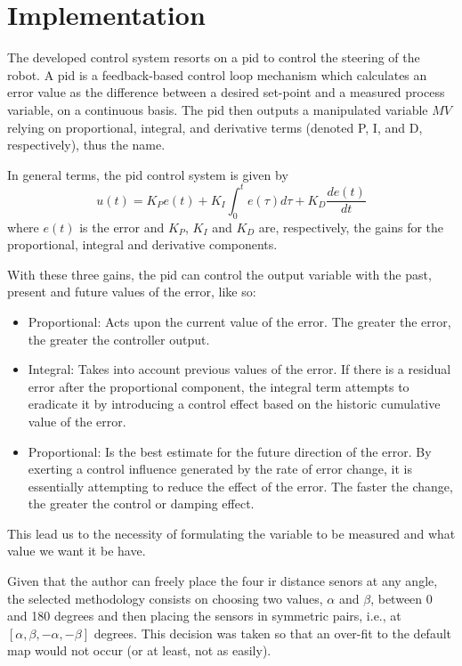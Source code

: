 \documentclass[runningheads]{llncs}
\begin{document}
\section{Implementation}
\label{sec:implementation}

The developed control system resorts on a \gls{pid} to control the steering of the robot. A \gls{pid} is a feedback-based control loop mechanism which calculates an error value as the difference between a desired set-point and a measured process variable, on a continuous basis. The \gls{pid} then outputs a manipulated variable $MV$ relying on proportional, integral, and derivative terms (denoted P, I, and D, respectively), thus the name.

In general terms, the \gls{pid} control system is given by 
%
\begin{equation}
    u(t) = K_P e(t) + K_I \int_0^t e(\tau) d\tau + K_D \frac{de(t)}{dt}
\end{equation}
%
where $e(t)$ is the error and $K_P$, $K_I$ and $K_D$ are, respectively, the gains for the proportional, integral and derivative components.

With these three gains, the \gls{pid} can control the output variable with the past, present and future values of the error, like so:

\begin{itemize}
    \item Proportional: Acts upon the current value of the error. The greater the error, the greater the controller output.
    \item Integral: Takes into account previous values of the error. If there is a residual error after the proportional component, the integral term attempts to eradicate it by introducing a control effect based on the historic cumulative value of the error. 
    \item Proportional: Is the best estimate for the future direction of the error. By exerting a control influence generated by the rate of error change, it is essentially attempting to reduce the effect of the error. The faster the change, the greater the control or damping effect.
\end{itemize}

This lead us to the necessity of formulating the variable to be measured and what value we want it be have.

Given that the author can freely place the four \gls{ir} distance senors at any angle, the selected methodology consists on choosing two values, $\alpha$ and $\beta$, between 0 and 180 degrees and then placing the sensors in symmetric pairs, i.e., at $[\alpha, \beta, -\alpha, -\beta]$ degrees. This decision was taken so that an over-fit to the default map would not occur (or at least, not as easily).
\end{document}
